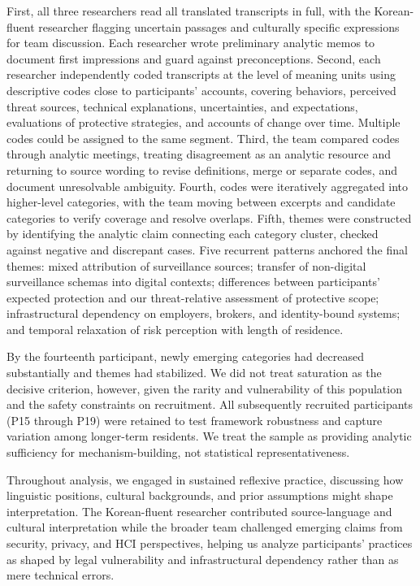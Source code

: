 \documentclass[conference,compsoc]{IEEEtran}
\begin{document}
First, all three researchers read all translated transcripts in full, with the Korean-fluent researcher flagging uncertain passages and culturally specific expressions for team discussion. Each researcher wrote preliminary analytic memos to document first impressions and guard against preconceptions. Second, each researcher independently coded transcripts at the level of meaning units using descriptive codes close to participants' accounts, covering behaviors, perceived threat sources, technical explanations, uncertainties, and expectations, evaluations of protective strategies, and accounts of change over time. Multiple codes could be assigned to the same segment. Third, the team compared codes through analytic meetings, treating disagreement as an analytic resource and returning to source wording to revise definitions, merge or separate codes, and document unresolvable ambiguity. Fourth, codes were iteratively aggregated into higher-level categories, with the team moving between excerpts and candidate categories to verify coverage and resolve overlaps. Fifth, themes were constructed by identifying the analytic claim connecting each category cluster, checked against negative and discrepant cases. Five recurrent patterns anchored the final themes: mixed attribution of surveillance sources; transfer of non-digital surveillance schemas into digital contexts; differences between participants' expected protection and our threat-relative assessment of protective scope; infrastructural dependency on employers, brokers, and identity-bound systems; and temporal relaxation of risk perception with length of residence.

By the fourteenth participant, newly emerging categories had decreased substantially and themes had stabilized. We did not treat saturation as the decisive criterion, however, given the rarity and vulnerability of this population and the safety constraints on recruitment. All subsequently recruited participants (P15 through P19) were retained to test framework robustness and capture variation among longer-term residents. We treat the sample as providing analytic sufficiency for mechanism-building, not statistical representativeness.

Throughout analysis, we engaged in sustained reflexive practice, discussing how linguistic positions, cultural backgrounds, and prior assumptions might shape interpretation. The Korean-fluent researcher contributed source-language and cultural interpretation while the broader team challenged emerging claims from security, privacy, and HCI perspectives, helping us analyze participants' practices as shaped by legal vulnerability and infrastructural dependency rather than as mere technical errors.
\end{document}
